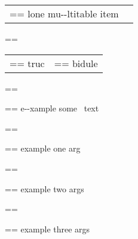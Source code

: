 \documentclass{book}
\makeatletter
\newenvironment{Texinfopreformatted}{%
  \par\GNUTobeylines\obeyspaces\frenchspacing\parskip=\z@\parindent=\z@}{}
{\catcode`\^^M=13 \gdef\GNUTobeylines{\catcode`\^^M=13 \def^^M{\null\par}}}
\newenvironment{Texinfoindented}{\begin{list}{}{}\item\relax}{\end{list}}
\renewcommand{\_}{\Texinfounderscore\discretionary{}{}{}}
\makeatother
\begin{document}
\begin{Texinfoindented}
\begin{tabular}{m{} m{}}
\begin{Texinfopreformatted}%
\ttfamily lone mu{-}{-}ltitable item
\end{Texinfopreformatted}&\\
\end{tabular}%
\begin{Texinfopreformatted}%
\ttfamily 
\end{Texinfopreformatted}
\begin{tabular}{m{} m{}}%
\begin{Texinfopreformatted}%
\ttfamily truc \end{Texinfopreformatted}&
\begin{Texinfopreformatted}%
\ttfamily bidule
\end{Texinfopreformatted}\\
\end{tabular}%
\begin{Texinfopreformatted}%
\ttfamily 
\end{Texinfopreformatted}
\begin{Texinfoindented}
\begin{Texinfopreformatted}%
\ttfamily e{-}{-}xample  some
\   text
\end{Texinfopreformatted}
\end{Texinfoindented}
\begin{Texinfopreformatted}%
\ttfamily 
\end{Texinfopreformatted}
\begin{Texinfoindented}
\begin{Texinfopreformatted}%
\ttfamily example one arg
\end{Texinfopreformatted}
\end{Texinfoindented}
\begin{Texinfopreformatted}%
\ttfamily 
\end{Texinfopreformatted}
\begin{Texinfoindented}
\begin{Texinfopreformatted}%
\ttfamily example two args
\end{Texinfopreformatted}
\end{Texinfoindented}
\begin{Texinfopreformatted}%
\ttfamily 
\end{Texinfopreformatted}
\begin{Texinfoindented}
\begin{Texinfopreformatted}%
\ttfamily example three args
\end{Texinfopreformatted}
\end{Texinfoindented}

\end{Texinfoindented}
\end{document}
